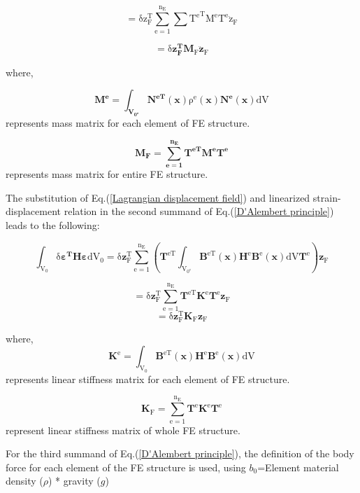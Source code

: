 \begin{equation}
\mathrm{=\delta z_{F}^{T}\sum_{e=1}^{n_{E}}{\sum}{T^{e}}^{T}M^{e}T^{e}\ddot{z}_{F}}
\end{equation}

\begin{equation}
\mathrm{=\delta\boldsymbol{z_{F}^{T}}\boldsymbol{M}_{F}\ddot{\boldsymbol{z}}_{F}}\label{first term of D'Alembert principle}
\end{equation}

where,

\[
\mathrm{\mathbf{M^{e}=\int_{\mathbf{V_{0^{e}}}}N^{eT}}(\mathbf{x})\rho^{e}(\mathbf{x})\mathbf{N^{e}}(\mathbf{x})dV}
\]
represents mass matrix for each element of FE structure.

\[
\mathbf{M_{F}=\sum_{e=1}^{n_{E}}T^{eT}M^{e}T^{e}}
\]
represents mass matrix for entire FE structure.

The substitution of Eq.(\ref{Lagrangian displacement field}) and
linearized strain-displacement relation in the second summand of Eq.(\ref{D'Alembert principle}) leads to the following:


\begin{equation}
\mathrm{\mathrm{\int_{V_{0}}\delta\mathbf{\varepsilon^{T}H\varepsilon}dV_{0}=\delta\mathbf{z}_{F}^{T}\sum_{e=1}^{n_{E}}(\mathbf{T}^{eT}\int_{V_{0^{e}}}\mathbf{B}^{eT}(\mathbf{x})\mathbf{H}^{e}\mathbf{B}^{e}(\mathbf{x})dV\mathbf{T}^{e})\mathbf{z}_{F}}}
\end{equation}


\[
\mathrm{\mathrm{=\delta}\mathbf{z}_{F}^{T}\sum_{e=1}^{n_{E}}\mathbf{T}^{eT}\mathbf{K}^{e}\mathbf{T}^{e}\mathbf{\mathbf{z}}_{F}}
\]
\begin{equation}
\mathrm{\mathrm{=\delta}\mathbf{z}_{F}^{T}\mathbf{K}_{F}\mathbf{z}_{F}}\label{second term of D'Alembert principle}
\end{equation}


where,
\[
\mathrm{\mathbf{K}^{e}=\int_{V_{0}}\mathbf{B}^{eT}(\mathbf{x})\mathbf{H}^{e}\mathbf{B}^{e}(\mathbf{x})dV}
\]
represents linear stiffness matrix for each element of FE structure.

\[
\mathrm{\mathbf{K}_{F}=\sum_{e=1}^{n_{E}}\mathbf{T}^{e}\mathbf{K}^{e}\mathbf{T}^{e}}
\]
represent linear stiffness matrix of whole FE structure.


For the third summand of Eq.(\ref{D'Alembert principle}), the definition
of the body force for each element of the FE structure is used, using
$b_{0}$=Element material density ($\rho$) {*} gravity ($g$)

